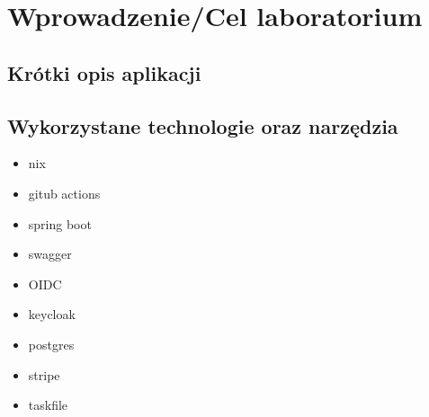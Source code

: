 \documentclass[../../spr.tex]{subfiles}
\begin{document}
\section{Wprowadzenie/Cel laboratorium}

\subsection{Krótki opis aplikacji}

\subsection{Wykorzystane technologie oraz narzędzia}

\begin{multicols}{3}
  \begin{itemize}
    \item nix
    \item gitub actions
    \item spring boot
    \item swagger
    \item OIDC
    \item keycloak
    \item postgres
    \item stripe
    \item taskfile
  \end{itemize}
\end{multicols}
\end{document}

